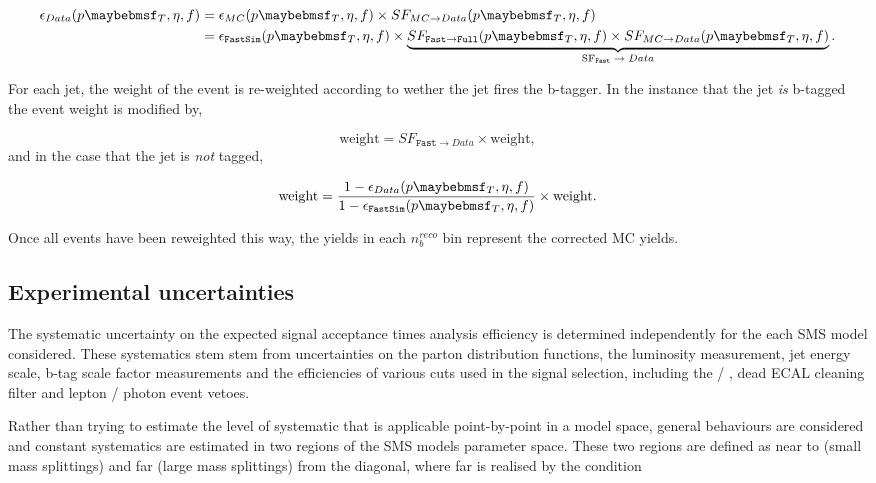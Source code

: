 \begin{align}
\epsilon_{Data}(\pt,\eta,f) &=  \epsilon_{MC}(\pt,\eta,f) \times SF_{MC\rightarrow Data}(\pt,\eta,f) \nonumber \\
&=  \epsilon_{\texttt{FastSim}}(\pt,\eta,f) \times \underbrace{SF_{\texttt{Fast}\rightarrow\texttt{Full}}(\pt,\eta,f) \times SF_{MC\rightarrow Data}(\pt,\eta,f)}_\text{SF$_{\texttt{Fast}} \rightarrow Data$}.
\end{align}

For each jet, the weight of the event is re-weighted according to wether the jet fires the b-tagger. In the instance that the jet \emph{is} b-tagged the event weight is modified by,

\begin{equation}
\text{weight} = SF_{\texttt{Fast} \rightarrow Data} \times \text{weight},
\end{equation} 
and in the case that the jet is \emph{not} tagged,

\begin{equation}
\text{weight} = \frac{1-\epsilon_{Data}(\pt,\eta,f)}{1- \epsilon_{\texttt{FastSim}}(\pt,\eta,f)}\times \text{weight}.
\end{equation}

 Once all events have been reweighted this way, the yields in each $n_{b}^{reco}$ bin represent the corrected MC yields. 

\subsection{Experimental uncertainties}

The systematic uncertainty on the expected signal acceptance times analysis efficiency is determined independently for the each \ac{SMS} model considered. These systematics stem stem from uncertainties on the parton distribution functions, the luminosity measurement, jet energy scale, b-tag scale factor measurements and the efficiencies of various cuts used in the signal selection, including the \mht / \met, dead \ac{ECAL} cleaning filter and lepton / photon event vetoes. 

Rather than trying to estimate the level of systematic that is applicable point-by-point in a model space, general behaviours are considered and constant systematics are estimated in two regions of the \ac{SMS} models parameter space. These two regions are defined as near to (small mass splittings) and far (large mass splittings) from the diagonal, where far is realised by the condition

